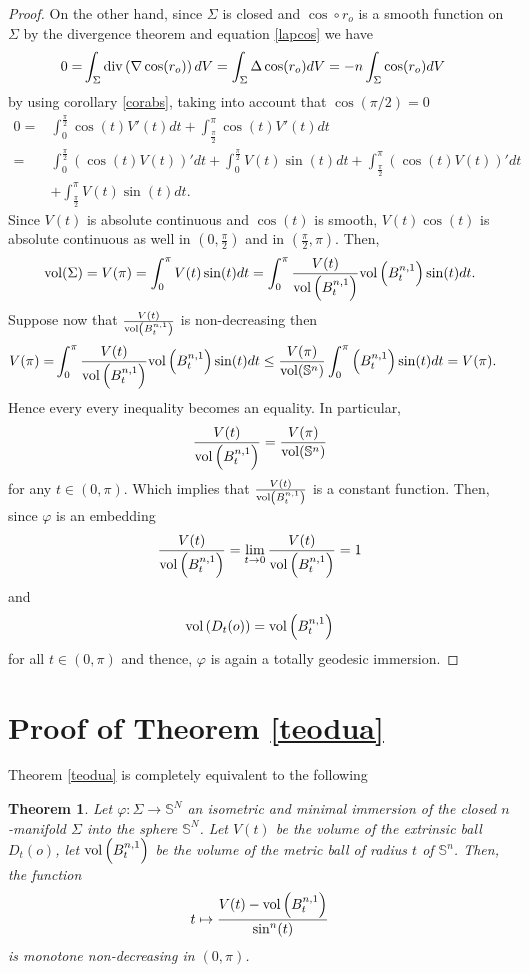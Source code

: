 \documentclass{amsart}
\newtheorem*{theorem*}{Theorem}
\theoremstyle{definition}
\theoremstyle{remark}
\begin{document}
\begin{proof}
 On the other hand, since $\Sigma$ is closed and $\cos\circ r_o$ is a smooth function on $\Sigma$ by the divergence theorem and equation \eqref{lapcos} we have
 \begin{equation}
    \begin{aligned}
    0=& \int_\Sigma {\rm div}\left(\nabla \cos(r_o)\right)dV=\int_\Sigma \Delta \cos(r_o)dV=-n\int_\Sigma \cos(r_o)dV
    \end{aligned} 
 \end{equation}
 by using corollary \ref{corabs}, taking into account that $\cos(\pi/2)=0$
 $$
 \begin{aligned}
 0=&\int_0^\frac{\pi}{2}\cos(t)V'(t)dt+\int_\frac{\pi}{2}^\pi \cos(t)V'(t)dt\\
 =&\int_0^\frac{\pi}{2}\left(\cos(t)V(t)\right)'dt+\int_0^\frac{\pi}{2}V(t)\sin(t)dt+
 \int_\frac{\pi}{2}^\pi\left(\cos(t)V(t)\right)'dt\\ &+\int_\frac{\pi}{2}^\pi V(t)\sin(t)dt.
 \end{aligned}
 $$
 Since $V(t)$ is absolute continuous and $\cos(t)$ is smooth, $V(t)\cos(t)$ is absolute continuous as well in $(0,\frac{\pi}{2})$ and in $(\frac{\pi}{2},\pi)$. Then,
 $$
 {\rm vol}(\Sigma)=V(\pi)=\int_0^\pi V(t)\sin(t)dt=\int_0^\pi \frac{V(t)}{{\rm vol}\left(B^{n,1}_t\right)}{\rm vol}\left(B^{n,1}_t\right)\sin(t)dt.
 $$
 Suppose now that $\frac{V(t)}{{\rm vol}\left(B^{n,1}_t\right)}$ is non-decreasing then
 $$
 \begin{aligned}
 V(\pi)=&\int_0^\pi \frac{V(t)}{{\rm vol}\left(B^{n,1}_t\right)}{\rm vol}\left(B^{n,1}_t\right)\sin(t)dt\leq \frac{V(\pi)}{{\rm vol}(\mathbb{S}^n)}\int_0^\pi \left(B^{n,1}_t\right)\sin(t)dt=V(\pi).
 \end{aligned}
 $$
 Hence every every inequality becomes an equality. In particular,
 $$
 \frac{V(t)}{{\rm vol}\left(B^{n,1}_t\right)}=\frac{V(\pi)}{{\rm vol}(\mathbb{S}^n)}
 $$
 for any $t\in (0,\pi)$. Which implies that $\frac{V(t)}{{\rm vol}\left(B^{n,1}_t\right)}$ is a constant function. Then, since $\varphi$ is an embedding
 $$
 \frac{V(t)}{{\rm vol}\left(B^{n,1}_t\right)}=\lim_{t\to 0}\frac{V(t)}{{\rm vol}\left(B^{n,1}_t\right)}=1
 $$
 and 
 $$
 {\rm vol}\left(D_t(o)\right)={\rm vol}\left(B^{n,1}_t\right)
 $$
 for all $t\in (0,\pi)$ and thence, $\varphi$ is again a totally geodesic immersion.  
 \end{proof}
\section{Proof of Theorem \ref{teodua}}
Theorem \ref{teodua} is completely equivalent to the following 
\begin{theorem*}
\label{teo3}Let $\varphi:\Sigma\to\mathbb{S}^N$ an isometric and minimal immersion of the closed $n$-manifold $\Sigma$ into the sphere $\mathbb{S}^N$.  Let $V(t)$ be the volume of the extrinsic ball $D_t(o)$, let ${\rm vol}\left(B^{n,1}_t\right)$ be the volume of the metric ball of radius $t$ of $\mathbb{S}^n$. Then, the function
 $$
 t\mapsto \frac{V(t)-{\rm vol}\left(B^{n,1}_t\right)}{\sin^n(t)}
 $$
 is monotone non-decreasing in $(0,\pi)$.
\end{theorem*}
\end{document}
